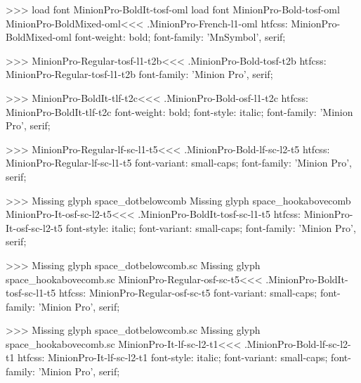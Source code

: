 {>>>
load font	MinionPro-BoldIt-tosf-oml
load font	MinionPro-Bold-tosf-oml
\<MinionPro-BoldMixed-oml\><<<
.MinionPro-French-l1-oml
htfcss:  MinionPro-BoldMixed-oml  font-weight: bold; font-family: 'MnSymbol', serif;

>>>
\<MinionPro-Regular-tosf-l1-t2b\><<<
.MinionPro-Bold-tosf-t2b
htfcss:  MinionPro-Regular-tosf-l1-t2b  font-family: 'Minion Pro', serif;

>>>
\<MinionPro-BoldIt-tlf-t2c\><<<
.MinionPro-Bold-osf-l1-t2c
htfcss:  MinionPro-BoldIt-tlf-t2c  font-weight: bold; font-style: italic; font-family: 'Minion Pro', serif;

>>>
\<MinionPro-Regular-lf-sc-l1-t5\><<<
.MinionPro-Bold-lf-sc-l2-t5
htfcss:  MinionPro-Regular-lf-sc-l1-t5  font-variant: small-caps; font-family: 'Minion Pro', serif;

>>>
Missing glyph	space_dotbelowcomb
Missing glyph	space_hookabovecomb
\<MinionPro-It-osf-sc-l2-t5\><<<
.MinionPro-BoldIt-tosf-sc-l1-t5
htfcss:  MinionPro-It-osf-sc-l2-t5  font-style: italic; font-variant: small-caps; font-family: 'Minion Pro', serif;

>>>
Missing glyph	space_dotbelowcomb.sc
Missing glyph	space_hookabovecomb.sc
\<MinionPro-Regular-osf-sc-t5\><<<
.MinionPro-BoldIt-tosf-sc-l1-t5
htfcss:  MinionPro-Regular-osf-sc-t5  font-variant: small-caps; font-family: 'Minion Pro', serif;

>>>
Missing glyph	space_dotbelowcomb.sc
Missing glyph	space_hookabovecomb.sc
\<MinionPro-It-lf-sc-l2-t1\><<<
.MinionPro-Bold-lf-sc-l2-t1
htfcss:  MinionPro-It-lf-sc-l2-t1  font-style: italic; font-variant: small-caps; font-family: 'Minion Pro', serif;

}
